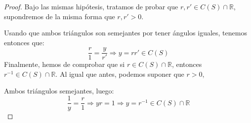 \begin{prop}
\begin{proof}
        \noindent
        Bajo las mismas hipótesis, tratamos de probar que $r,r'\in C(S)\cap \mathbb{R}$, supondremos de la misma forma que $r,r'>0$. 
        \begin{figure}[H]
            \centering
        \end{figure}
        \noindent
        Usando que ambos triángulos son semejantes por tener ángulos iguales, tenemos entonces que:
        \begin{equation*}
            \dfrac{r}{1} = \dfrac{y}{r'} \Longrightarrow y=rr'\in C(S)
        \end{equation*}
        Finalmente, hemos de comprobar que si $r\in C(S)\cap \mathbb{R}$, entonces $r^{-1}\in C(S)\cap \mathbb{R}$. Al igual que antes, podemos suponer que $r>0$, 
        \begin{figure}[H]
            \centering
        \end{figure}
        Ambos triángulos semejantes, luego:
        \begin{equation*}
            \dfrac{1}{y} = \dfrac{r}{1} \Longrightarrow yr = 1 \Longrightarrow y= r^{-1}\in C(S)\cap \mathbb{R}
        \end{equation*}
    \end{proof}
\end{prop}

